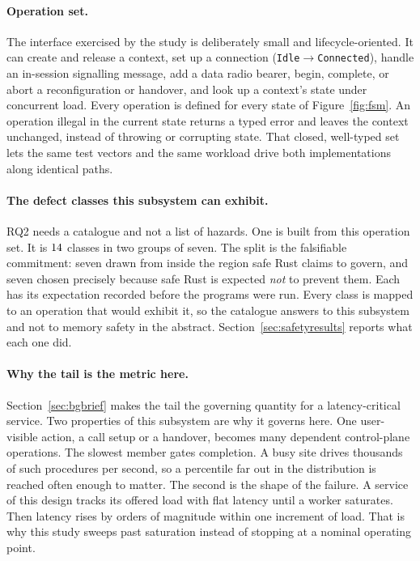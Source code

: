 \documentclass[english,oneside,a4paper,censored,csm,software-track-2020]{HYthesisML}
\begin{document}
\paragraph{Operation set.}
The interface exercised by the study is deliberately small and lifecycle-oriented. It can
create and release a context, set up a connection (\texttt{Idle}$\rightarrow$\texttt{Connected}),
handle an in-session signalling message, add a data radio bearer, begin, complete, or abort a
reconfiguration or handover, and look up a context's state under concurrent load. Every
operation is defined for every state of Figure~\ref{fig:fsm}. An operation illegal in the
current state returns a typed error and leaves the context unchanged, instead of throwing or
corrupting state. That closed, well-typed set lets the same test vectors and the same workload
drive both implementations along identical paths.

\paragraph{The defect classes this subsystem can exhibit.}
RQ2 needs a catalogue and not a list of hazards. One is built from this operation set. It is
$14$ classes in two groups of seven. The split is the falsifiable commitment: seven
drawn from inside the region safe Rust claims to govern, and seven chosen precisely because
safe Rust is expected \emph{not} to prevent them. Each has its expectation recorded before the
programs were run. Every class is mapped to an operation that would exhibit it, so the
catalogue answers to this subsystem and not to memory safety in the abstract.
Section~\ref{sec:safetyresults} reports what each one did.

\paragraph{Why the tail is the metric here.}
Section~\ref{sec:bgbrief} makes the tail the governing quantity for a latency-critical service.
Two properties of this subsystem are why it governs here. One user-visible action, a call
setup or a handover, becomes many dependent control-plane operations. The slowest member gates
completion. A busy site drives thousands of such procedures per second, so a percentile far
out in the distribution is reached often enough to matter. The second is the shape of the
failure. A service of this design tracks its offered load with flat latency until a worker
saturates. Then latency rises by orders of magnitude within one increment of load. That is why
this study sweeps past saturation instead of stopping at a nominal operating point.
\end{document}
